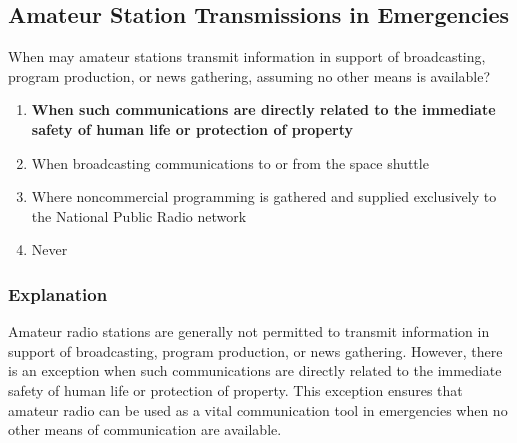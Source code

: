 \subsection{Amateur Station Transmissions in Emergencies}
\label{T1D09}

\begin{tcolorbox}[colback=gray!10!white,colframe=black!75!black,title=T1D09]
When may amateur stations transmit information in support of broadcasting, program production, or news gathering, assuming no other means is available?
\begin{enumerate}[label=\Alph*,noitemsep]
    \item \textbf{When such communications are directly related to the immediate safety of human life or protection of property}
    \item When broadcasting communications to or from the space shuttle
    \item Where noncommercial programming is gathered and supplied exclusively to the National Public Radio network
    \item Never
\end{enumerate}
\end{tcolorbox}

\subsubsection*{Explanation}
Amateur radio stations are generally not permitted to transmit information in support of broadcasting, program production, or news gathering. However, there is an exception when such communications are directly related to the immediate safety of human life or protection of property. This exception ensures that amateur radio can be used as a vital communication tool in emergencies when no other means of communication are available.